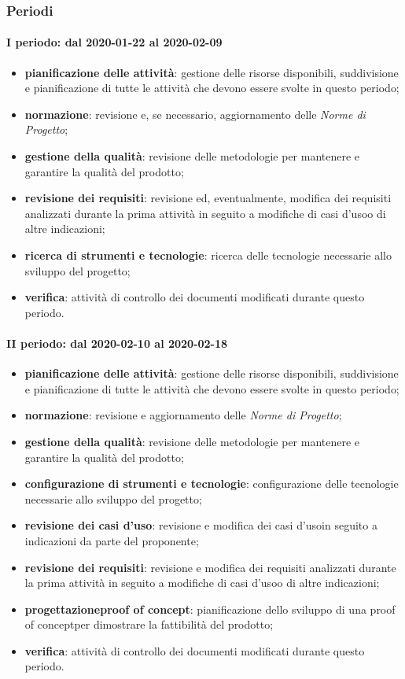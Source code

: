 \subsubsection{Periodi}
\paragraph*{I periodo: dal 2020-01-22 al 2020-02-09}
\begin{itemize}
	\item \textbf{pianificazione delle attività}: gestione delle risorse disponibili, suddivisione e pianificazione di tutte le attività che devono essere svolte in questo periodo;
	\item \textbf{normazione}: revisione e, se necessario, aggiornamento delle \textit{Norme di Progetto};
	\item \textbf{gestione della qualità}: revisione delle metodologie per mantenere e garantire la qualità del prodotto\glo;
	\item \textbf{revisione dei requisiti}: revisione ed, eventualmente, modifica dei requisiti analizzati durante la prima attività in seguito a modifiche di casi d'uso\glosp o di altre indicazioni;
	\item \textbf{ricerca di strumenti e tecnologie}: ricerca delle tecnologie necessarie allo sviluppo del progetto\glo;
	\item \textbf{verifica}: attività di controllo dei documenti modificati durante questo periodo.
\end{itemize}

\paragraph*{II periodo: dal 2020-02-10 al 2020-02-18}
\begin{itemize}
	\item \textbf{pianificazione delle attività}: gestione delle risorse disponibili, suddivisione e pianificazione di tutte le attività che devono essere svolte in questo periodo;
	\item \textbf{normazione}: revisione e aggiornamento delle \textit{Norme di Progetto};
	\item \textbf{gestione della qualità}: revisione delle metodologie per mantenere e garantire la qualità del prodotto\glo;
	\item \textbf{configurazione di strumenti e tecnologie}: configurazione delle tecnologie necessarie allo sviluppo del progetto\glo;
	\item \textbf{revisione dei casi d'uso}: revisione e modifica dei casi d'uso\glosp in seguito a indicazioni da parte del proponente;
	\item \textbf{revisione dei requisiti}: revisione e modifica dei requisiti analizzati durante la prima attività in seguito a modifiche di casi d'uso\glosp o di altre indicazioni;
	\item \textbf{progettazione}\glosp\textbf{proof of concept}\glo: pianificazione dello sviluppo di una proof of concept\glosp per dimostrare la fattibilità del prodotto\glo;
	\item \textbf{verifica}: attività di controllo dei documenti modificati durante questo periodo.
\end{itemize}

